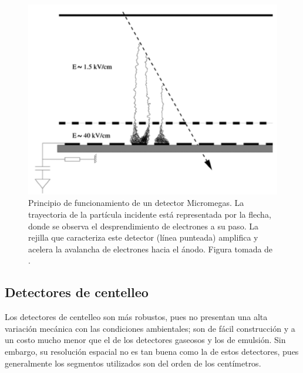 \documentclass[12pt,oneside,openany,letter]{book}
\begin{document}
\begin{figure}
\begin{center}
\includegraphics[scale=0.7]{images/gaseoso.png}
\caption[Principio de funcionamiento de un detector de Micromegas]{Principio de funcionamiento de un detector Micromegas. La trayectoria de la part\'icula incidente est\'a representada por la flecha, donde se observa el desprendimiento de electrones a su paso. La rejilla que caracteriza este detector (l\'inea punteada) amplifica y acelera la avalancha de electrones hacia el \'anodo. Figura tomada de \cite{procureur2018muon}.}
\label{gaseoso}
\end{center}
\end{figure}

\subsection{Detectores de centelleo}
Los detectores de centelleo son m\'as robustos, pues no presentan una alta variaci\'on mec\'anica con las condiciones ambientales; son de f\'acil construcci\'on y a un costo mucho menor que el de los detectores gaseosos y los de emulsi\'on. Sin embargo, su resoluci\'on espacial no es tan buena como la de estos detectores, pues generalmente los segmentos utilizados son del orden de los cent\'imetros. 
\end{document}
